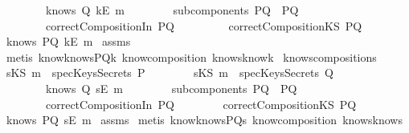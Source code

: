 \begin{isabellebody}
\ \ \ \ \ \ \ \ {\isachardoublequoteopen}knows\ Q\ {\isacharbrackleft}kE\ m{\isacharbrackright}{\isachardoublequoteclose}\isanewline
\ \ \ \ \ \ \ \ {\isachardoublequoteopen}subcomponents\ PQ\ {\isacharequal}\ {\isacharbraceleft}P{\isacharcomma}Q{\isacharbraceright}{\isachardoublequoteclose}\isanewline
\ \ \ \ \ \ \ \ {\isachardoublequoteopen}correctCompositionIn\ PQ{\isachardoublequoteclose}\ \isanewline
\ \ \ \ \ \ \ \ {\isachardoublequoteopen}correctCompositionKS\ PQ{\isachardoublequoteclose}\isanewline
{}\ {\isachardoublequoteopen}knows\ PQ\ {\isacharbrackleft}kE\ m{\isacharbrackright}{\isachardoublequoteclose}\isanewline
\isadelimproof
\endisadelimproof
\isatagproof
{}\isamarkupfalse \ assms\isanewline
{}\isamarkupfalse \ {\isacharparenleft}metis\ know{}knowsPQ{\isacharunderscore}k\ know{\isacharunderscore}composition\ knows{}know{\isacharunderscore}k{\isacharparenright}\endisatagproof
{\isafoldproof}\isadelimproof
\isanewline
\endisadelimproof
\isanewline
{}\isamarkupfalse \ knows{\isacharunderscore}composition{}{\isacharunderscore}s{\isacharcolon}\isanewline
{}\ {\isachardoublequoteopen}{\isacharparenleft}sKS\ m{\isacharparenright}\ {\isasymnotin}\ specKeysSecrets\ P{\isachardoublequoteclose}\isanewline
\ \ \ \ \ \ \ \ {\isachardoublequoteopen}{\isacharparenleft}sKS\ m{\isacharparenright}\ {\isasymnotin}\ specKeysSecrets\ Q{\isachardoublequoteclose}\isanewline
\ \ \ \ \ \ \ \ {\isachardoublequoteopen}knows\ Q\ {\isacharbrackleft}sE\ m{\isacharbrackright}{\isachardoublequoteclose}\isanewline
\ \ \ \ \ \ \ \ {\isachardoublequoteopen}subcomponents\ PQ\ {\isacharequal}\ {\isacharbraceleft}P{\isacharcomma}Q{\isacharbraceright}{\isachardoublequoteclose}\isanewline
\ \ \ \ \ \ \ \ {\isachardoublequoteopen}correctCompositionIn\ PQ{\isachardoublequoteclose}\isanewline
\ \ \ \ \ \ \ \ {\isachardoublequoteopen}correctCompositionKS\ PQ{\isachardoublequoteclose}\ \isanewline
{}\ {\isachardoublequoteopen}knows\ PQ\ {\isacharbrackleft}sE\ m{\isacharbrackright}{\isachardoublequoteclose}\isanewline
\isadelimproof
\endisadelimproof
\isatagproof
{}\isamarkupfalse \ assms\isanewline
{}\isamarkupfalse \ {\isacharparenleft}metis\ know{}knowsPQ{\isacharunderscore}s\ know{\isacharunderscore}composition\ knows{}know{\isacharunderscore}s{\isacharparenright}\endisatagproof

\end{isabellebody}
